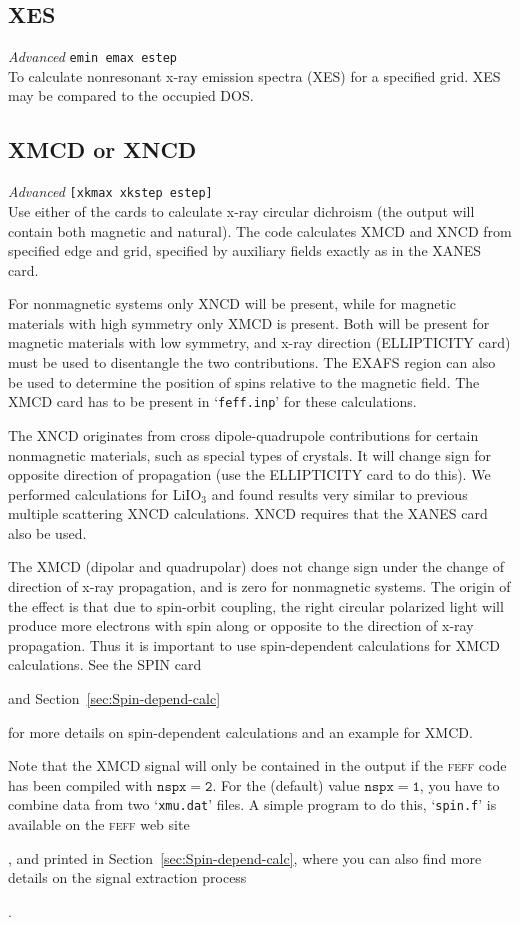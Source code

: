 \documentclass[11pt,oneside]{report} %
\renewcommand{\htmlref}[2]{\hyperlink{#2}{#1}}
\newcommand{\program}[1]{\textsc{#1}}
\newcommand{\feff}{\program{feff}}
\newenvironment{Card}[4]%
      {\vspace{3ex}%
        \subsection{#1}
        \quad\textsl{#3}\newline
        \quad\texttt{#2}\newline%
        \label{card:#4}\\}
      {}
\newcommand{\file}[1]{`\texttt{#1}'}
\renewcommand{\htmlref}[2]{{#1}} %
\begin{document}
\begin{Card}{XES}{emin  emax  estep}{Advanced}{xes}
  To calculate nonresonant x-ray emission spectra (XES) for a specified
  grid. XES may be compared to the occupied DOS.
\end{Card}



\begin{Card}{XMCD or XNCD}{[xkmax xkstep estep]}{Advanced}{xnc}
  Use either of the cards to calculate x-ray circular dichroism
 (the output will contain both magnetic and natural).
 The code calculates XMCD and XNCD from specified edge and grid, specified 
 by auxiliary fields exactly as in the \htmlref{XANES}{card:xan} card.
 
  For nonmagnetic systems only XNCD will be present,
 while for magnetic materials with high symmetry only XMCD is present.
 Both will be present for magnetic materials with low symmetry, and
 x-ray direction (\htmlref{ELLIPTICITY}{card:ell} card) must be used to 
 disentangle the two contributions. The EXAFS region can also be used to 
 determine the position of spins relative to the magnetic field. The XMCD card 
 has to be present in \file{feff.inp} for these calculations. 

  The XNCD originates from cross dipole-quadrupole contributions
 for certain nonmagnetic materials, such as special types of crystals.
 It will change sign for opposite direction of propagation (use the 
 ELLIPTICITY card to do this). We performed calculations  for LiIO$_3$ 
 and found results very similar to previous multiple scattering XNCD 
 calculations. XNCD requires that the XANES card also be used.

  The XMCD (dipolar and quadrupolar) does not change sign under the
 change of direction of x-ray propagation, and is zero for nonmagnetic
 systems. The origin of the effect is that due to spin-orbit coupling,
 the right circular polarized light will produce more electrons
 with spin along or opposite to the direction of x-ray propagation.
 Thus it is important to use spin-dependent calculations for XMCD
 calculations. See the \htmlref{SPIN}{card:spi} card
 \begin{latexonly}
 and Section~\ref{sec:Spin-depend-calc}
 \end{latexonly}
 for more details on spin-dependent calculations and an example for XMCD.

  Note that the XMCD signal will only be contained in the output if the 
 {\feff} code has been compiled with $\mathtt{nspx=2}$. For the (default) 
 value $\mathtt{nspx=1}$, you have to combine data from two \file{xmu.dat}
 files. A simple program to do this, \file{spin.f} is available on the {\feff} 
 web site
 \begin{latexonly}, and printed in Section~\ref{sec:Spin-depend-calc}, 
 where you can also find more details on the signal extraction process
 \end{latexonly}.

\end{Card}
\end{document}
